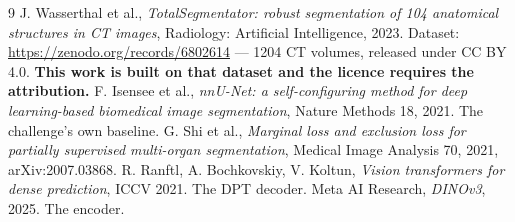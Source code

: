 \documentclass{article}
\begin{document}
\begin{thebibliography}{9}
 J. Wasserthal et al., \emph{TotalSegmentator: robust
    segmentation of 104 anatomical structures in CT images}, Radiology:
    Artificial Intelligence, 2023. Dataset:
    \url{https://zenodo.org/records/6802614} --- 1204 CT volumes, released under
    CC BY 4.0. \textbf{This work is built on that dataset and the licence
    requires the attribution.}
 F. Isensee et al., \emph{nnU-Net: a self-configuring method for
    deep learning-based biomedical image segmentation}, Nature Methods 18, 2021.
    The challenge's own baseline.
 G. Shi et al., \emph{Marginal loss and exclusion loss for
    partially supervised multi-organ segmentation}, Medical Image Analysis 70,
    2021, arXiv:2007.03868.
 R. Ranftl, A. Bochkovskiy, V. Koltun, \emph{Vision transformers
    for dense prediction}, ICCV 2021. The DPT decoder.
 Meta AI Research, \emph{DINOv3}, 2025. The encoder.
\end{thebibliography}
\end{document}

